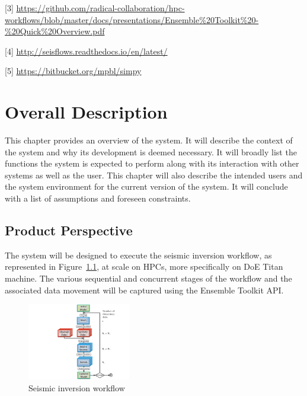 \documentclass{scrreprt}
\begin{document}
[3] \url{https://github.com/radical-collaboration/hpc-workflows/blob/master/docs/presentations/Ensemble\%20Toolkit\%20-\%20Quick\%20Overview.pdf}

[4] \url{http://seisflows.readthedocs.io/en/latest/}

[5] \url{https://bitbucket.org/mpbl/simpy}


\chapter{Overall Description}

This chapter provides an overview of the system. It will describe the context of the system and why its development is deemed necessary. It will broadly list the functions the system is expected to perform along with its interaction with other systems as well as the user. This chapter will also describe the intended users and the system environment for the current version of the system. It will conclude with a list of assumptions and foreseen constraints.


\section{Product Perspective}

The system will be designed to execute the seismic inversion workflow, as represented in Figure~\ref{fig:seismic_wflow}, at scale on HPCs, more specifically on DoE Titan machine. The various sequential and concurrent stages of the workflow and the associated data movement will be captured using the Ensemble Toolkit API.

\begin{figure}
\includegraphics[width=0.4\textwidth]{SeismicWorkflow.pdf}
\caption{Seismic inversion workflow}
\label{fig:seismic_wflow}
\end{figure}
\end{document}
